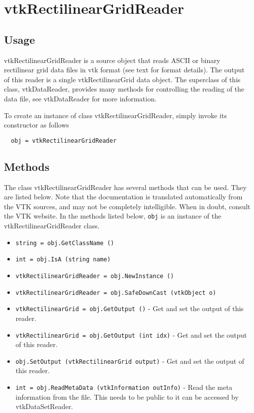 \section{vtkRectilinearGridReader}

\subsection{Usage}

 vtkRectilinearGridReader is a source object that reads ASCII or binary 
 rectilinear grid data files in vtk format (see text for format details).
 The output of this reader is a single vtkRectilinearGrid data object.
 The superclass of this class, vtkDataReader, provides many methods for
 controlling the reading of the data file, see vtkDataReader for more
 information.

To create an instance of class vtkRectilinearGridReader, simply
invoke its constructor as follows
\begin{verbatim}
  obj = vtkRectilinearGridReader
\end{verbatim}
\subsection{Methods}

The class vtkRectilinearGridReader has several methods that can be used.
  They are listed below.
Note that the documentation is translated automatically from the VTK sources,
and may not be completely intelligible.  When in doubt, consult the VTK website.
In the methods listed below, \verb|obj| is an instance of the vtkRectilinearGridReader class.
\begin{itemize}
\item  \verb|string = obj.GetClassName ()|

\item  \verb|int = obj.IsA (string name)|

\item  \verb|vtkRectilinearGridReader = obj.NewInstance ()|

\item  \verb|vtkRectilinearGridReader = obj.SafeDownCast (vtkObject o)|

\item  \verb|vtkRectilinearGrid = obj.GetOutput ()| -  Get and set the output of this reader.

\item  \verb|vtkRectilinearGrid = obj.GetOutput (int idx)| -  Get and set the output of this reader.

\item  \verb|obj.SetOutput (vtkRectilinearGrid output)| -  Get and set the output of this reader.

\item  \verb|int = obj.ReadMetaData (vtkInformation outInfo)| -  Read the meta information from the file.  This needs to be public to it
 can be accessed by vtkDataSetReader.

\end{itemize}
